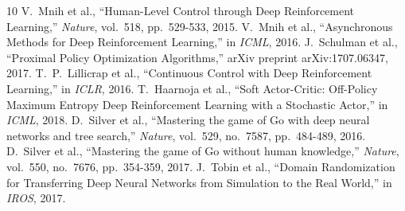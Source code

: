 \documentclass{article}
\begin{document}
\begin{thebibliography}{10}
 V.~Mnih et al., ``Human-Level Control through Deep Reinforcement Learning,'' \textit{Nature}, vol.~518, pp.~529-533, 2015.
 V.~Mnih et al., ``Asynchronous Methods for Deep Reinforcement Learning,'' in \textit{ICML}, 2016.
 J.~Schulman et al., ``Proximal Policy Optimization Algorithms,'' arXiv preprint arXiv:1707.06347, 2017.
 T.~P.~Lillicrap et al., ``Continuous Control with Deep Reinforcement Learning,'' in \textit{ICLR}, 2016.
 T.~Haarnoja et al., ``Soft Actor-Critic: Off-Policy Maximum Entropy Deep Reinforcement Learning with a Stochastic Actor,'' in \textit{ICML}, 2018.
 D.~Silver et al., ``Mastering the game of Go with deep neural networks and tree search,'' \textit{Nature}, vol.~529, no.~7587, pp.~484-489, 2016.
 D.~Silver et al., ``Mastering the game of Go without human knowledge,'' \textit{Nature}, vol.~550, no.~7676, pp.~354-359, 2017.
 J.~Tobin et al., ``Domain Randomization for Transferring Deep Neural Networks from Simulation to the Real World,'' in \textit{IROS}, 2017.

\end{thebibliography}
\end{document}
